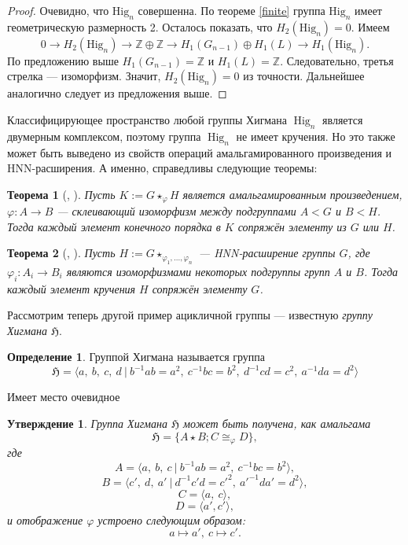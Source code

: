 \documentclass[14pt, dvipsnames]{extarticle}
\newtheorem{theorem}{Теорема}
\newtheorem{statement}{Утверждение}
\theoremstyle{definition}
\newtheorem{defi}{Определение}
\theoremstyle{remark}
\DeclareMathOperator{\Hig}{\mathrm{Hig}}
\begin{document}
\begin{proof}
Очевидно, что $\mathrm{Hig}_n$ совершенна. По теореме \ref{finite} группа $\mathrm{Hig}_n$ имеет геометрическую размерность 2. Осталось показать, что $H_2(\mathrm{Hig}_n)=0$. Имеем $$0\to H_2(\mathrm{Hig}_n)\to \mathbb{Z}\oplus\mathbb{Z}\to H_1(G_{n-1})\oplus H_{1}(L)\to H_1(\mathrm{Hig}_n).$$ По предложению выше $H_1(G_{n-1})=\mathbb{Z}$ и $H_1(L)=\mathbb{Z}$. Следовательно, третья стрелка --- изоморфизм. Значит, $H_2(\mathrm{Hig}_n)=0$ из точности. Дальнейшее аналогично следует из предложения выше.
\end{proof}

Классифицирующее пространство любой группы Хигмана $\Hig_n$ является двумерным комплексом, поэтому группа $\Hig_n$ не имеет кручения. Но это также может быть выведено из свойств операций амальгамированного произведения и HNN-расширения. А именно, справедливы следующие теоремы:

\begin{theorem}[\cite{Magnus}, \cite{Serre}]
Пусть $K:= G\star_\varphi H$ является амальгамированным произведением, $\varphi: A\to B$ --- склеивающий изоморфизм между подгруппами $A < G$ и $B < H$. Тогда каждый элемент конечного порядка в $K$ сопряжён элементу из $G$ или $H$.
\end{theorem}

\begin{theorem}[\cite{Magnus}, \cite{Serre}]
Пусть $H:= G\star_{\varphi_1, ..., \varphi_n}$ --- HNN-расширение группы $G$, где $\varphi_i: A_i\to B_i$ являются изоморфизмами некоторых подгруппы групп $A$ и $B$. Тогда каждый элемент кручения $H$ сопряжён элементу $G$.
\end{theorem}












\iffalse

Рассмотрим теперь другой пример ацикличной группы --- известную {\it группу Хигмана $\mathfrak{H}$}.

\begin{defi}
Группой Хигмана называется группа $$\mathfrak{H}=\langle a,\ b,\ c,\ d\ |\ b^{-1}ab=a^2,\ c^{-1}bc=b^2,\ d^{-1}cd=c^2,\ a^{-1}da=d^2 \rangle$$
\end{defi}

Имеет место очевидное

\begin{statement}
Группа Хигмана $\mathfrak{H}$ может быть получена, как амальгама $$\mathfrak{H}=\{ A\star B; C\cong_\varphi D\},$$ где $$A=\langle a,\  b,\ c\ |\ b^{-1}ab=a^2,\ c^{-1}bc=b^2  \rangle,$$ $$B=\langle c',\ d,\ a'\ |\ d^{-1}c'd=c'^2,\ a'^{-1}da'=d^2\rangle,$$ $$C=\langle a,\ c\rangle,$$ $$D=\langle a', c' \rangle,$$ и отображение $\varphi$ устроено следующим образом: $$a\mapsto a',\ c\mapsto c'.$$
\end{statement}
\end{document}

